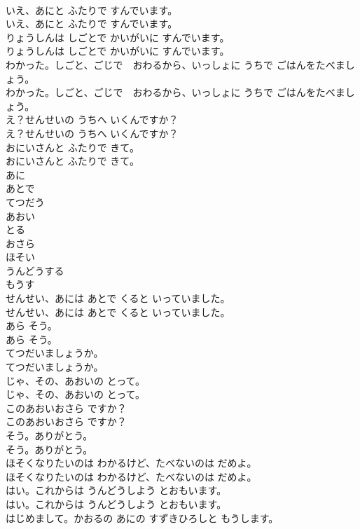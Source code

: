 \documentclass[8pt]{extreport}
\begin{document}
\begin{CJK}{UTF8}{min}
\\	いえ、あにと ふたりで すんでいます。	
\\	いえ、あにと ふたりで すんでいます。 
\\	りょうしんは しごとで かいがいに すんでいます。	
\\	りょうしんは しごとで かいがいに すんでいます。 
\\	わかった。しごと、ごじで　おわるから、いっしょに うちで ごはんをたべましょう。	
\\	わかった。しごと、ごじで　おわるから、いっしょに うちで ごはんをたべましょう。 
\\	え？せんせいの うちへ いくんですか？	
\\	え？せんせいの うちへ いくんですか？ 
\\	おにいさんと ふたりで きて。	
\\	おにいさんと ふたりで きて。 
\\	あに
\\	あとで
\\	てつだう
\\	あおい
\\	とる
\\	おさら
\\	ほそい
\\	うんどうする
\\	もうす
\\	せんせい、あには あとで くると いっていました。	
\\	せんせい、あには あとで くると いっていました。 
\\	あら そう。	
\\	あら そう。 
\\	てつだいましょうか。	
\\	てつだいましょうか。 
\\	じゃ、その、あおいの とって。	
\\	じゃ、その、あおいの とって。 
\\	このあおいおさら ですか？	
\\	このあおいおさら ですか？ 
\\	そう。ありがとう。	
\\	そう。ありがとう。 
\\	ほそくなりたいのは わかるけど、たべないのは だめよ。	
\\	ほそくなりたいのは わかるけど、たべないのは だめよ。 
\\	はい。これからは うんどうしよう とおもいます。	
\\	はい。これからは うんどうしよう とおもいます。 
\\	はじめまして。かおるの あにの すずきひろしと もうします。	

\end{CJK}
\end{document}
